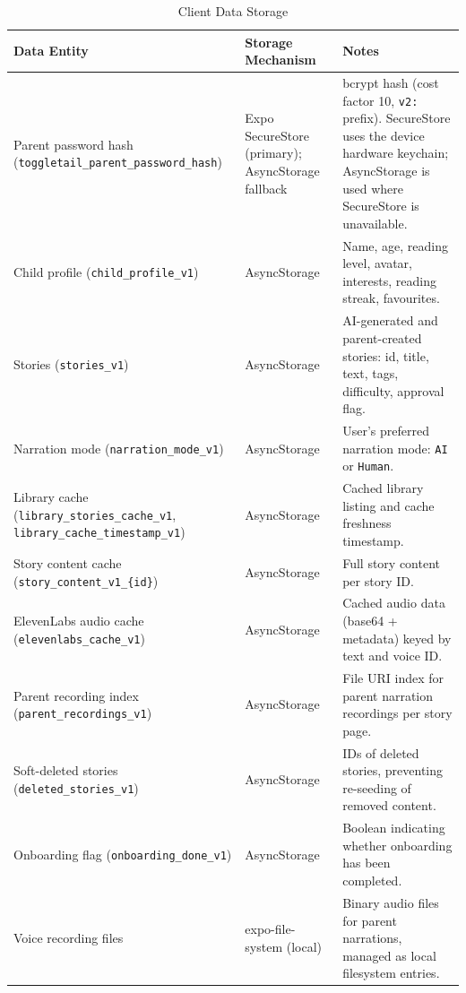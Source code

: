 \begin{table}[H]
\centering
\caption{Client Data Storage}
\label{tab:data_storage}
\renewcommand{\arraystretch}{1.4}
\begin{tabularx}{\textwidth}{|>{\RaggedRight\arraybackslash}p{4.5cm}|>{\RaggedRight\arraybackslash}p{3cm}|>{\RaggedRight\arraybackslash}X|}
\hline
\textbf{Data Entity} & \textbf{Storage Mechanism} & \textbf{Notes} \\
\hline
Parent password hash (\texttt{toggletail\_parent\_password\_hash}) & Expo SecureStore (primary); AsyncStorage fallback & bcrypt hash (cost factor 10, \texttt{v2:} prefix). SecureStore uses the device hardware keychain; AsyncStorage is used where SecureStore is unavailable. \\
\hline
Child profile (\texttt{child\_profile\_v1}) & AsyncStorage & Name, age, reading level, avatar, interests, reading streak, favourites. \\
\hline
Stories (\texttt{stories\_v1}) & AsyncStorage & AI-generated and parent-created stories: id, title, text, tags, difficulty, approval flag. \\
\hline
Narration mode (\texttt{narration\_mode\_v1}) & AsyncStorage & User's preferred narration mode: \texttt{AI} or \texttt{Human}. \\
\hline
Library cache (\texttt{library\_stories\_cache\_v1}, \texttt{library\_cache\_timestamp\_v1}) & AsyncStorage & Cached library listing and cache freshness timestamp. \\
\hline
Story content cache (\texttt{story\_content\_v1\_\{id\}}) & AsyncStorage & Full story content per story ID. \\
\hline
ElevenLabs audio cache (\texttt{elevenlabs\_cache\_v1}) & AsyncStorage & Cached audio data (base64 + metadata) keyed by text and voice ID. \\
\hline
Parent recording index (\texttt{parent\_recordings\_v1}) & AsyncStorage & File URI index for parent narration recordings per story page. \\
\hline
Soft-deleted stories (\texttt{deleted\_stories\_v1}) & AsyncStorage & IDs of deleted stories, preventing re-seeding of removed content. \\
\hline
Onboarding flag (\texttt{onboarding\_done\_v1}) & AsyncStorage & Boolean indicating whether onboarding has been completed. \\
\hline
Voice recording files & expo-file-system (local) & Binary audio files for parent narrations, managed as local filesystem entries. \\
\hline
\end{tabularx}
\end{table}

